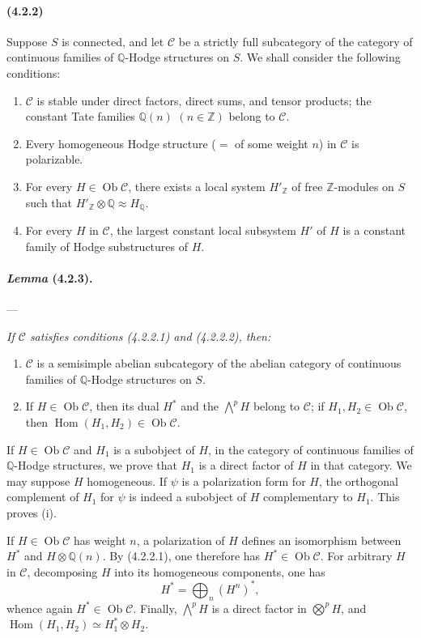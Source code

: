 \documentclass[10pt]{article}
\newcommand{\Q}{\mathbb Q}
\newcommand{\Z}{\mathbb Z}
\newcommand{\Hom}{\operatorname{Hom}}
\newcommand{\Ob}{\operatorname{Ob}}
\begin{document}
\paragraph{(4.2.2)} Suppose $S$ is connected, and let $\mathcal C$ be a strictly full subcategory of the category of continuous families of $\Q$-Hodge structures on $S$. We shall consider the following conditions:
\begin{enumerate}[label=(4.2.2.\arabic*)]
\item $\mathcal C$ is stable under direct factors, direct sums, and tensor products; the constant Tate families $\Q(n)$ $(n\in\Z)$ belong to $\mathcal C$.
\item Every homogeneous Hodge structure ($={}$ of some weight $n$) in $\mathcal C$ is polarizable.
\item For every $H\in\Ob\mathcal C$, there exists a local system $H'_\Z$ of free $\Z$-modules on $S$ such that $H'_\Z\otimes\Q\approx H_\Q$.
\item For every $H$ in $\mathcal C$, the largest constant local subsystem $H'$ of $H$ is a constant family of Hodge substructures of $H$.
\end{enumerate}

\paragraph{\emph{Lemma} (4.2.3).} --- {\itshape If $\mathcal C$ satisfies conditions (4.2.2.1) and (4.2.2.2), then:
\begin{enumerate}[label=(\roman*)]
\item $\mathcal C$ is a semisimple abelian subcategory of the abelian category of continuous families of $\Q$-Hodge structures on $S$.
\item If $H\in\Ob\mathcal C$, then its dual $H^*$ and the $\bigwedge^pH$ belong to $\mathcal C$; if $H_1,H_2\in\Ob\mathcal C$, then $\Hom(H_1,H_2)\in\Ob\mathcal C$.
\end{enumerate}}

If $H\in\Ob\mathcal C$ and $H_1$ is a subobject of $H$, in the category of continuous families of $\Q$-Hodge structures, we prove that $H_1$ is a direct factor of $H$ in that category. We may suppose $H$ homogeneous. If $\psi$ is a polarization form for $H$, the orthogonal complement of $H_1$ for $\psi$ is indeed a subobject of $H$ complementary to $H_1$. This proves (i).

If $H\in\Ob\mathcal C$ has weight $n$, a polarization of $H$ defines an isomorphism between $H^*$ and $H\otimes\Q(n)$. By (4.2.2.1), one therefore has $H^*\in\Ob\mathcal C$. For arbitrary $H$ in $\mathcal C$, decomposing $H$ into its homogeneous components, one has
\[
H^*=\bigoplus_n (H^n)^*,
\]
whence again $H^*\in\Ob\mathcal C$. Finally, $\bigwedge^pH$ is a direct factor in $\bigotimes^pH$, and $\Hom(H_1,H_2)\simeq H_1^*\otimes H_2$.
\end{document}
